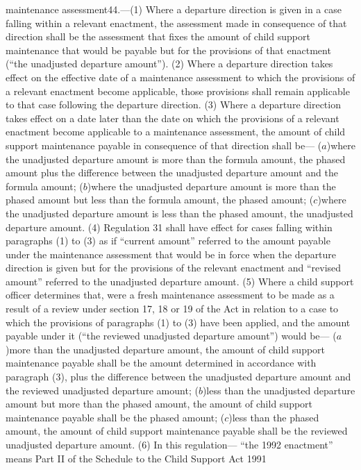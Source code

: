 \documentclass[a4paper]{article}
\begin{document}
maintenance assessment44.—(1) Where a departure direction is given in a case
falling within a relevant enactment, the assessment made in consequence of that
direction shall be the assessment that fixes the amount of child support
maintenance that would be payable but for the provisions of that enactment (“the
unadjusted departure amount”).
(2) Where a departure direction takes effect on the effective date of a
maintenance assessment to which the provisions of a relevant enactment become
applicable, those provisions shall remain applicable to that case following the
departure direction.
(3) Where a departure direction takes effect on a date later than the date on
which the provisions of a relevant enactment become applicable to a maintenance
assessment, the amount of child support maintenance payable in consequence of
that direction shall be—
($a$)where the unadjusted departure amount is more than the formula amount, the
phased amount plus the difference between the unadjusted departure amount and
the formula amount;
($b$)where the unadjusted departure amount is more than the phased amount but less
than the formula amount, the phased amount;
($c$)where the unadjusted departure amount is less than the phased amount, the
unadjusted departure amount.
(4) Regulation 31 shall have effect for cases falling within paragraphs (1) to
(3) as if “current amount” referred to the amount payable under the maintenance
assessment that would be in force when the departure direction is given but for
the provisions of the relevant enactment and “revised amount” referred to the
unadjusted departure amount.
(5) Where a child support officer determines that, were a fresh maintenance
assessment to be made as a result of a review under section 17, 18 or 19 of the
Act in relation to a case to which the provisions of paragraphs (1) to (3) have
been applied, and the amount payable under it (“the reviewed unadjusted
departure amount”) would be—
($a$)more than the unadjusted departure amount, the amount of child support
maintenance payable shall be the amount determined in accordance with paragraph
(3), plus the difference between the unadjusted departure amount and the
reviewed unadjusted departure amount;
($b$)less than the unadjusted departure amount but more than the phased amount,
the amount of child support maintenance payable shall be the phased amount;
($c$)less than the phased amount, the amount of child support maintenance payable
shall be the reviewed unadjusted departure amount.
(6) In this regulation—
“the 1992 enactment” means Part II of the Schedule to the Child Support Act 1991
\end{document}
